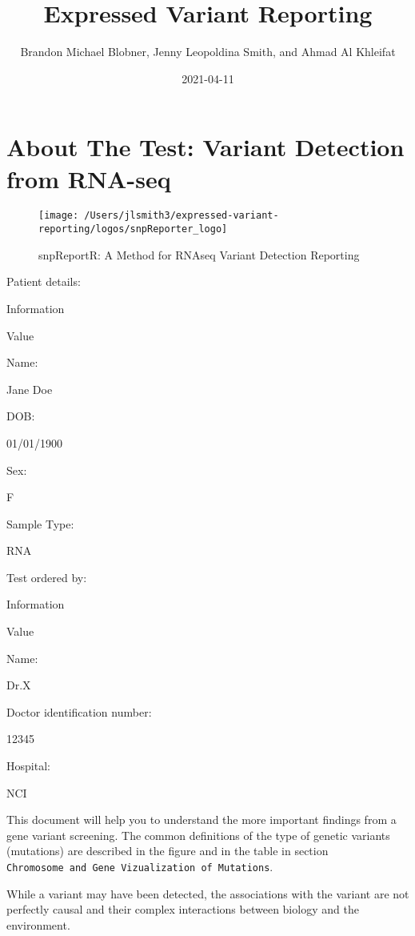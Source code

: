 \documentclass[
]{article}
\title{Expressed Variant Reporting}
\author{Brandon Michael Blobner, Jenny Leopoldina Smith, and Ahmad Al
Khleifat}
\date{2021-04-11}
\begin{document}
\maketitle

{
\setcounter{tocdepth}{3}
\tableofcontents
}
\hypertarget{about-the-test-variant-detection-from-rna-seq}{%
\section{About The Test: Variant Detection from
RNA-seq}\label{about-the-test-variant-detection-from-rna-seq}}

\begin{figure}

{\centering \texttt{[image: /Users/jlsmith3/expressed-variant-reporting/logos/snpReporter\_logo]} 

}

\caption{snpReportR: A Method for RNAseq Variant Detection Reporting}\label{fig:unnamed-chunk-3}
\end{figure}

Patient details:

Information

Value

Name:

Jane Doe

DOB:

01/01/1900

Sex:

F

Sample Type:

RNA

Test ordered by:

Information

Value

Name:

Dr.X

Doctor identification number:

12345

Hospital:

NCI

This document will help you to understand the more important findings
from a gene variant screening. The common definitions of the type of
genetic variants (mutations) are described in the figure and in the
table in section
\texttt{Chromosome\ and\ Gene\ Vizualization\ of\ Mutations}.

While a variant may have been detected, the associations with the
variant are not perfectly causal and their complex interactions between
biology and the environment.
\end{document}
